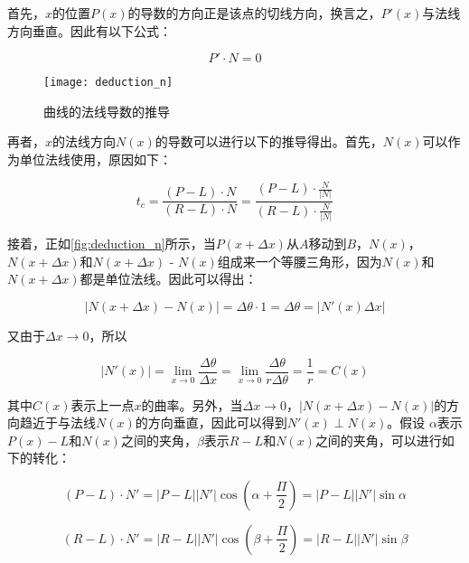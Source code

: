 首先，$x$的位置$P(x)$的导数的方向正是该点的切线方向，换言之，$P'(x)$与法线方向垂直。因此有以下公式：

\begin{equation}\label{eq:perp}
    P'\cdot{N} = 0
\end{equation}

\begin{figure}[bth]
    \centering
    \texttt{[image: deduction\_n]}
    \caption{\label{fig:deduction_n}
    曲线的法线导数的推导}
\end{figure}

再者，$x$的法线方向$N(x)$的导数可以进行以下的推导得出。首先，$N(x)$可以作为单位法线使用，原因如下：

\begin{equation}
    t_c = \frac{(P-L)\cdot{N}}{(R-L)\cdot{N}} = \frac{(P-L)\cdot{\frac{N}{|N|}}}{(R-L)\cdot{\frac{N}{|N|}}}
\end{equation}

接着，正如\autoref{fig:deduction_n}所示，当$P(x+\Delta x)$从$A$移动到$B$，$N(x)$，$N(x+\Delta x)$和$N(x+\Delta x)$ - $N(x)$组成来一个等腰三角形，因为$N(x)$和$N(x+\Delta x)$都是单位法线。因此可以得出：

\begin{equation}
    |N(x+\Delta x) - N(x)| = \Delta\theta \cdot 1 = \Delta\theta = |N'(x)\Delta x|
\end{equation}

又由于$\Delta x \to 0$，所以

\begin{equation}\label{eq:curvature}
    |N'(x)| = \lim_{x \to 0}\frac{\Delta\theta}{\Delta x} = \lim_{x \to 0}\frac{\Delta\theta}{r\Delta\theta} = \frac{1}{r} = C(x)
\end{equation}

其中$C(x)$表示\ec{}上一点$x$的曲率。另外，当$\Delta x \to 0$，$|N(x+\Delta x) - N(x)|$的方向趋近于与法线$N(x)$的方向垂直，因此可以得到$N'(x) \perp N(x)$。假设 $\alpha$表示$P(x)-L$和$N(x)$之间的夹角，$\beta$表示$R-L$和$N(x)$之间的夹角，可以进行如下的转化：

\begin{equation}\label{eq:alpha}
(P-L)\cdot{N'} = |P-L|{|N'|}\cos{(\alpha+\frac{\Pi}{2})} = |P-L|{|N'|}\sin\alpha
\end{equation}

\begin{equation}\label{eq:beta}
(R-L)\cdot{N'} = |R-L|{|N'|}\cos{(\beta+\frac{\Pi}{2})} = |R-L|{|N'|}\sin\beta
\end{equation}

